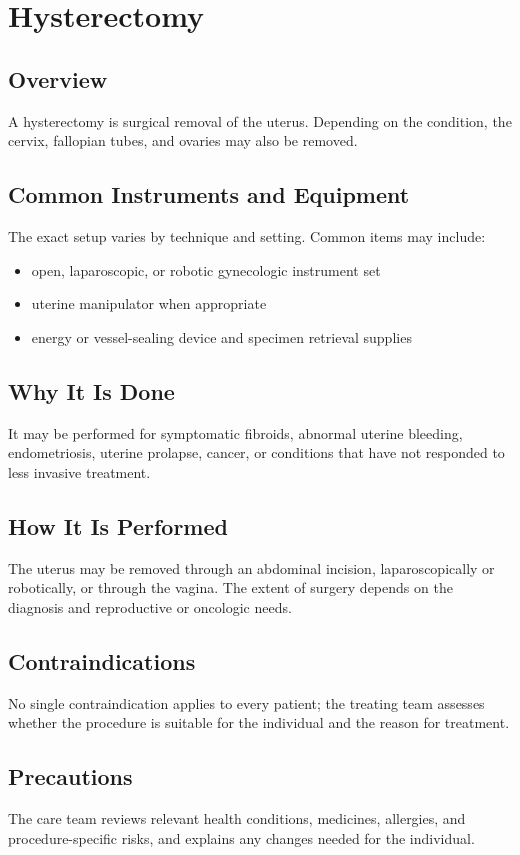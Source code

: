\chapter{Hysterectomy}

\section*{Overview}
A hysterectomy is surgical removal of the uterus. Depending on the condition, the cervix, fallopian tubes, and ovaries may also be removed.

\section*{Common Instruments and Equipment}
The exact setup varies by technique and setting. Common items may include:
\begin{itemize}[nosep,leftmargin=*]
  \item open, laparoscopic, or robotic gynecologic instrument set
  \item uterine manipulator when appropriate
  \item energy or vessel-sealing device and specimen retrieval supplies
\end{itemize}

\section*{Why It Is Done}
It may be performed for symptomatic fibroids, abnormal uterine bleeding, endometriosis, uterine prolapse, cancer, or conditions that have not responded to less invasive treatment.

\section*{How It Is Performed}
The uterus may be removed through an abdominal incision, laparoscopically or robotically, or through the vagina. The extent of surgery depends on the diagnosis and reproductive or oncologic needs.

\section*{Contraindications}
No single contraindication applies to every patient; the treating team assesses whether the procedure is suitable for the individual and the reason for treatment.

\section*{Precautions}
The care team reviews relevant health conditions, medicines, allergies, and procedure-specific risks, and explains any changes needed for the individual.

